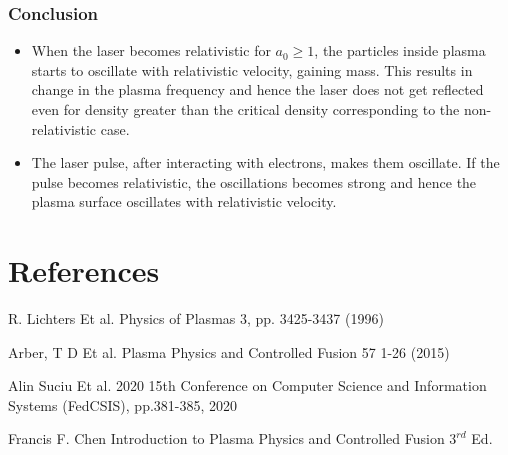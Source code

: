 \documentclass{beamer}
\begin{document}
\begin{frame}
    \frametitle{Conclusion}
    \small
    \begin{itemize}
        \item When the laser becomes relativistic for $a_0 \ge 1$, the particles inside plasma starts to oscillate with relativistic velocity, gaining mass. This results in change in the plasma frequency and hence the laser does not get reflected even for density greater than the critical density corresponding to the non-relativistic case.
        \item The laser pulse, after interacting with electrons, makes them oscillate. If the pulse becomes relativistic, the oscillations becomes strong and hence the plasma surface oscillates with relativistic velocity.
    \end{itemize}
    \section{References}

    \begin{thebibliography}{9}
        R. Lichters Et al. Physics of Plasmas 3, pp. 3425-3437 (1996)

        Arber, T D Et al. Plasma Physics and Controlled Fusion 57 1-26 (2015)

        Alin Suciu Et al. 2020 15th Conference on Computer Science and Information Systems (FedCSIS), pp.381-385, 2020

        Francis F. Chen
        Introduction to Plasma Physics and Controlled Fusion $3^{rd}$ Ed.

    \end{thebibliography}
\end{frame}
\end{document}

